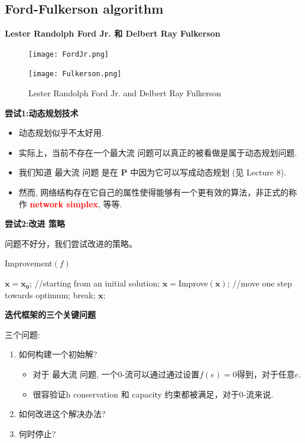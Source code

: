 \subsection{Ford-Fulkerson algorithm}

\textbf{Lester Randolph Ford Jr. 和 Delbert Ray Fulkerson}

 \begin{figure}[H]%
   \begin{center}%
     \begin{minipage}{0.40\textwidth}%
      \texttt{[image: FordJr.png]}%
     \end{minipage}%
     \qquad
     \begin{minipage}{0.40\textwidth}
      \texttt{[image: Fulkerson.png]}%
     \end{minipage}%
   \end{center}
   \caption{ Lester Randolph Ford Jr. and Delbert Ray Fulkerson}
 \end{figure}

\textbf{尝试1:动态规划技术}

\begin{itemize}
\item
动态规划似乎不太好用.
\item
实际上，当前不存在一个{\sc 最大流} 问题可以真正的被看做是属于动态规划问题.
 \item
我们知道 {\sc 最大流} 问题 是在 $\mathbf{P}$ 中因为它可以写成动态规划 (见 Lecture 8).
\item
然而, 网络结构存在它自己的属性使得能够有一个更有效的算法，非正式的称作 \textcolor{red}{\bf network simplex}, 等等.
\end{itemize}

\textbf{尝试2:{\sc 改进} 策略}

问题不好分，我们尝试改进的策略。


{\sc Improvement}$(f)$
\begin{algorithmic}[1]
\STATE $\mathbf{x=x_0}$; //starting from an initial solution;
\STATE $\mathbf{x}=${\sc Improve}$(\mathbf{x})$; //move one step towards optimum;
\STATE break;
\ENDIF
\ENDWHILE
\RETURN $\mathbf{x}$;
\end{algorithmic}


\textbf{迭代框架的三个关键问题}


三个问题:
\begin{enumerate}
\item 如何构建一个初始解?
	\begin{itemize}
	\item 对于 {\sc 最大流} 问题,  一个0-流可以通过通过设置$f(e)=0$得到，对于任意$e$.
	\item 很容验证h {\sc conservation} 和 {\sc capacity} 约束都被满足，对于0-流来说.
	\end{itemize}
\item 如何改进这个解决办法?
\item 何时停止?
\end{enumerate}

